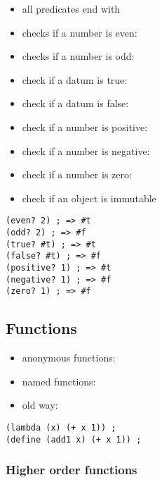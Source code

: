 \documentclass[a4paper,landscape,10pt]{article}
\begin{document}
\begin{multicols*}{2}
  \begin{itemize}
    \item all predicates end with 
    \item checks if a number is even: 
    \item checks if a number is odd: 
    \item check if a datum is true: 
    \item check if a datum is false: 
    \item check if a number is positive: 
    \item check if a number is negative: 
    \item check if a number is zero: 
    \item check if an object is immutable 
  \end{itemize}

  \begin{lstlisting}[language=Racket]
(even? 2) ; => #t
(odd? 2) ; => #f
(true? #t) ; => #t
(false? #t) ; => #f
(positive? 1) ; => #t
(negative? 1) ; => #f
(zero? 1) ; => #f
\end{lstlisting}

  \subsection{Functions}

  \begin{itemize}
    \item anonymous functions: 
    \item named functions: 
    \item old way: 
  \end{itemize}

  \begin{lstlisting}[language=Racket]
(lambda (x) (+ x 1)) ;
(define (add1 x) (+ x 1)) ;
\end{lstlisting}

  \subsubsection{Higher order functions}


\end{multicols*}
\end{document}
